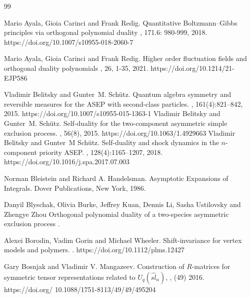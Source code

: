 \documentclass{ximera}
\begin{document}
\begin{thebibliography}{99}

Mario Ayala, Gioia Carinci and Frank Redig.
\newblock Quantitative Boltzmann–Gibbs principles via orthogonal polynomial duality
,  171.6: 980-999, 2018.
 https://doi.org/10.1007/s10955-018-2060-7

Mario Ayala, Gioia Carinci and Frank Redig.
\newblock Higher order fluctuation fields and orthogonal duality polynomials
,  26, 1-35, 2021.
https://doi.org/10.1214/21-EJP586

Vladimir Belitsky and Gunter~M. Sch{\"u}tz.
\newblock Quantum algebra symmetry and reversible measures for the {ASEP} with
  second-class particles.
, 161(4):821--842, 2015.
https://doi.org/10.1007/s10955-015-1363-1
Vladimir Belitsky and Gunter~M. Sch{\"u}tz.
\newblock Self-duality for the two-component asymmetric simple exclusion
  process.
, 56(8), 2015.
https://doi.org/10.1063/1.4929663
Vladimir Belitsky and Gunter~M Sch{\"u}tz.
\newblock Self-duality and shock dynamics in the $n$-component priority {ASEP}.
, 128(4):1165--1207,
  2018. https://doi.org/10.1016/j.spa.2017.07.003





Norman Bleistein and Richard A. Handelsman.
\newblock Asymptotic Expansions of Integrals.
\newblock Dover Publications, New York, 1986.


Danyil Blyschak, Olivia Burke, Jeffrey Kuan, Dennis Li, Sasha Ustilovsky and Zhengye Zhou
\newblock Orthogonal polynomial duality of a two-species asymmetric exclusion process
. 



Alexei Borodin, Vadim Gorin and Michael Wheeler.
\newblock Shift-invariance for vertex models and polymers.
.
 https://doi.org/10.1112/plms.12427

{Gary Bosnjak and Vladimir V. Mangazeev}.
\newblock 	Construction of $R$-matrices for symmetric tensor representations related to $U_q(\hat{sl}_n)$,
, (49) 2016.
https://doi.org/ 
10.1088/1751-8113/49/49/495204



\end{thebibliography}
\end{document}
